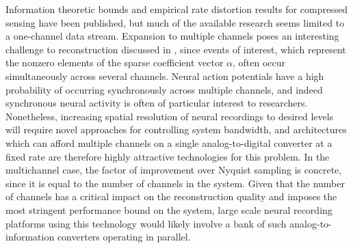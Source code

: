 \documentclass[11pt]{paper}
\begin{document}
Information theoretic bounds \cite{aeron2010, sarvotham2006} and empirical 
rate distortion results for compressed sensing \cite{rambeloarison2012} have
been published, but much of the available research seems limited to a 
one-channel data stream. Expansion to multiple channels poses an interesting
challenge to reconstruction discussed in \cite{romberg2009}, since events of
interest, which represent the nonzero elements of the sparse coefficient 
vector $\alpha$, often occur simultaneously across several channels. Neural
action potentials have a high probability of occurring synchronously across
multiple channels, and indeed synchronous neural activity is often of 
particular interest to researchers. Nonetheless, increasing spatial 
resolution of neural recordings to desired levels will require novel
approaches for controlling system bandwidth, and architectures which can
afford multiple channels on a single analog-to-digital converter at a fixed
rate are therefore highly attractive technologies for this problem. In the
multichannel case, the factor of improvement over Nyquist sampling is 
concrete, since it is equal to the number of channels in the system. Given
that the number of channels has a critical impact on the reconstruction
quality and imposes the most stringent performance bound on the system,
large scale neural recording platforms using this technology would likely
involve a bank of such analog-to-information converters operating in
parallel.
\end{document}
